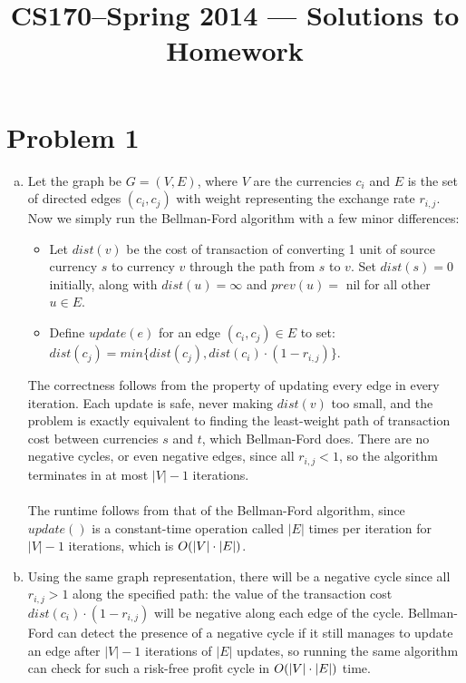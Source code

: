 \documentclass[11pt]{article}
\title{CS170--Spring 2014 --- Solutions to Homework \Homework}
\author{\Name}
\let\origleft\left
\let\origright\right
\renewcommand{\left}{\mathopen{}\mathclose\bgroup\origleft}
\renewcommand{\right}{\aftergroup\egroup\origright}
\newcommand{\p}[1]{\left(#1\right)}
\newcommand{\BigOh}[1]{O\p{#1}}
\begin{document}
\maketitle
{}
\setcounter{problemnumber}{0}

\section*{Problem 1}
\begin{enumerate}[(a)]
\item Let the graph be $G=(V,E)$, where $V$ are the currencies $c_i$ and $E$ is the set of directed edges $(c_i,c_j)$ with weight representing the exchange rate $r_{i,j}$. Now we simply run the Bellman-Ford algorithm with a few minor differences:
\begin{itemize}
\item Let $dist(v)$ be the cost of transaction of converting 1 unit of source currency $s$ to currency $v$ through the path from $s$ to $v$. Set $dist(s)=0$ initially, along with $dist(u)=\infty$ and $prev(u)=$ nil for all other $u\in E$.
\item Define $update(e)$ for an edge $(c_i,c_j)\in E$ to set:\\
$dist(c_j)=min\{dist(c_j),dist(c_i)\cdot (1-r_{i,j})\}$. 
\end{itemize}
The correctness follows from the property of updating every edge in every iteration. Each update is safe, never making $dist(v)$ too small, and the problem is exactly equivalent to finding the least-weight path of transaction cost between currencies $s$ and $t$, which Bellman-Ford does. There are no negative cycles, or even negative edges, since all $r_{i,j}<1$, so the algorithm terminates in at most $|V|-1$ iterations. \\\\
The runtime follows from that of the Bellman-Ford algorithm, since $update()$ is a constant-time operation called $|E|$ times per iteration for $|V|-1$ iterations, which is $\BigOh{|V|\cdot |E|}$.
\item Using the same graph representation, there will be a negative cycle since all $r_{i,j}>1$ along the specified path: the value of the transaction cost $dist(c_i)\cdot (1-r_{i,j})$ will be negative along each edge of the cycle. Bellman-Ford can detect the presence of a negative cycle if it still manages to update an edge after $|V|-1$ iterations of $|E|$ updates, so running the same algorithm can check for such a risk-free profit cycle in $\BigOh{|V|\cdot |E|}$ time.
\end{enumerate}
\end{document}
